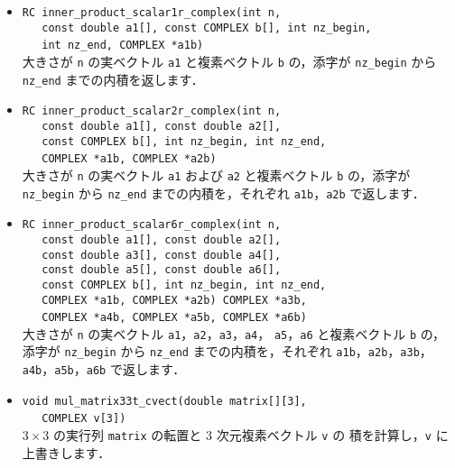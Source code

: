 \begin{itemize}
\item \verb|RC inner_product_scalar1r_complex(int n, | \\
	\verb|   const double a1[], const COMPLEX b[], int nz_begin, | \\
	\verb|   int nz_end, COMPLEX *a1b)| \ \\
大きさが \verb|n| の実ベクトル \verb|a1| と複素ベクトル \verb|b| の，添字が 
\verb|nz_begin| から \verb|nz_end| までの内積を返します．

\item \verb|RC inner_product_scalar2r_complex(int n, | \\
	\verb|   const double a1[], const double a2[], | \\
	\verb|   const COMPLEX b[], int nz_begin, int nz_end, | \\
	\verb|   COMPLEX *a1b, COMPLEX *a2b)| \ \\
大きさが \verb|n| の実ベクトル \verb|a1| および \verb|a2| と複素ベクトル 
\verb|b| の，添字が \verb|nz_begin| から \verb|nz_end| までの内積を，それぞれ
\verb|a1b|，\verb|a2b| で返します．

\item \verb|RC inner_product_scalar6r_complex(int n, | \\
	\verb|   const double a1[], const double a2[], | \\
	\verb|   const double a3[], const double a4[], | \\
	\verb|   const double a5[], const double a6[], | \\
	\verb|   const COMPLEX b[], int nz_begin, int nz_end, | \\
	\verb|   COMPLEX *a1b, COMPLEX *a2b) COMPLEX *a3b, | \\
	\verb|   COMPLEX *a4b, COMPLEX *a5b, COMPLEX *a6b)| \ \\
大きさが \verb|n| の実ベクトル \verb|a1|，\verb|a2|，\verb|a3|，\verb|a4|，
\verb|a5|，\verb|a6| と複素ベクトル \verb|b| の，添字が \verb|nz_begin| から 
\verb|nz_end| までの内積を，それぞれ \verb|a1b|，\verb|a2b|，\verb|a3b|，
\verb|a4b|，\verb|a5b|，\verb|a6b| で返します．

\item \verb|void mul_matrix33t_cvect(double matrix[][3], | \\
	\verb|   COMPLEX v[3])| \ \\
$3 \times 3$ の実行列 \verb|matrix| の転置と $3$ 次元複素ベクトル \verb|v| の
積を計算し，\verb|v| に上書きします．

\end{itemize}


